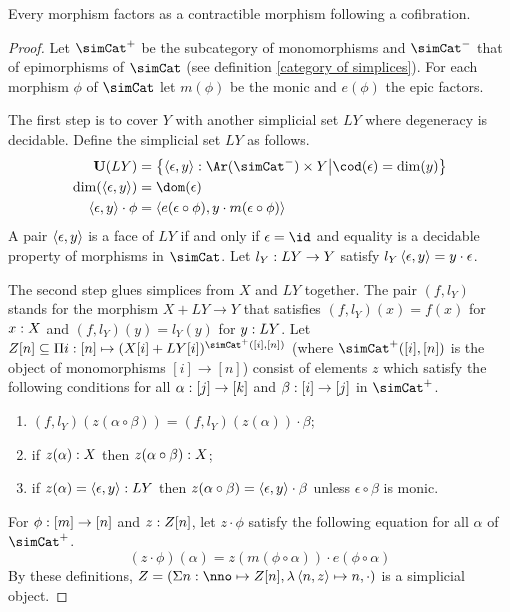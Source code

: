 \documentclass[csh.tex]{subfiles}
\begin{document}
\begin{proposition} Every morphism factors as a contractible morphism following a cofibration. \label{factor1} \end{proposition}

\begin{proof}
Let $\simCat^+$ be the subcategory of monomorphisms and $\simCat^-$ that of epimorphisms of $\simCat$ (see definition \ref{category of simplices}). For each morphism $\phi$ of $\simCat$ let $m(\phi)$ be the monic and $e(\phi)$ the epic factors.

The first step is to cover $Y$ with another simplicial set $LY$ where degeneracy is decidable. Define the simplicial set $LY$ as follows.
\begin{align*}
\base(LY) &= \set{\tuplet{\epsilon,y}\of \Ar(\simCat^-)\times Y\middle| \cod(\epsilon)=\dim(y)}\\
\dim(\tuplet{\epsilon,y}) &= \dom(\epsilon)\\
\tuplet{\epsilon,y}\cdot \phi &= \tuplet{e(\epsilon\circ \phi),y\cdot m(\epsilon\circ\phi)}
\end{align*}
A pair $\left\langle \epsilon,y \right\rangle$ is a face of $LY$ if and only if $\epsilon=\id$ and equality is a decidable property of morphisms in $\simCat$.
Let $l_Y: LY\to Y$ satisfy $l_Y\left\langle \epsilon,y \right\rangle=y\cdot\epsilon$.


The second step glues simplices from $X$ and $LY$ together.
The pair $(f,l_Y)$ stands for the morphism $X+LY\to Y$ that satisfies $(f,l_Y)(x)=f(x)$ for $x: X$ and $(f,l_Y)(y) = l_Y(y)$ for $y: LY$.
Let $Z[n]\subseteq \product{i\of[n]}{(X[i]+LY[i])^{\simCat^+([i],[n])}}$ (where $\simCat^+([i],[n])$ is the object of monomorphisms $[i]\to [n]$) consist of elements $z$ which satisfy the following conditions for all $\alpha: [j]\to [k]$ and $\beta: [i]\to[j]$ in $\simCat^+$.
\begin{enumerate}
\item $(f,l_Y)(z(\alpha\circ\beta)) = (f,l_Y)(z(\alpha))\cdot\beta$;
\item if $z(\alpha): X$ then $z(\alpha\circ\beta): X$;
\item if $z(\alpha)=\left\langle \epsilon,y \right\rangle: LY$ then $z(\alpha\circ\beta) = \left\langle \epsilon,y \right\rangle\cdot\beta$ unless $\epsilon\circ\beta$ is monic.
\end{enumerate}
For $\phi:[m]\to [n]$ and $z: Z[n]$, let $z\cdot\phi$ satisfy the following equation for all $\alpha$ of $\simCat^+$.
\[ (z\cdot\phi)(\alpha) = z(m(\phi\circ\alpha))\cdot e(\phi\circ \alpha) \]
By these definitions, $Z=(\coproduct{n\of\nno}{Z[n]},\function{\tuplet{n,z}}n,\cdot)$ is a simplicial object.


\end{proof}
\end{document}
